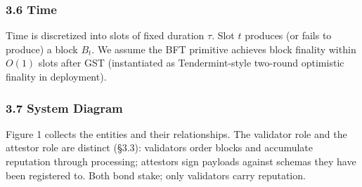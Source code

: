 \documentclass[
  11pt,
]{article}
\begin{document}
\subsubsection{3.6 Time}\label{time}

Time is discretized into slots of fixed duration \(\tau\). Slot \(t\)
produces (or fails to produce) a block \(B_t\). We assume the BFT
primitive achieves block finality within \(O(1)\) slots after GST
(instantiated as Tendermint-style two-round optimistic finality in
deployment).

\subsubsection{3.7 System Diagram}\label{system-diagram}

Figure 1 collects the entities and their relationships. The validator
role and the attestor role are distinct (§3.3): validators order blocks
and accumulate reputation through processing; attestors sign payloads
against schemas they have been registered to. Both bond stake; only
validators carry reputation.
\end{document}
